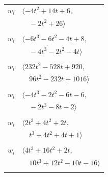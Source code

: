 \documentclass[11pt]{article}
\begin{document}
\begin{longtable}{@{}ll@{}}
$w_i$ & $\langle -4t^{2}+14t+6,$\\
 & $\quad -2t^{2}+26\rangle$\\
\addlinespace[2pt]
\multicolumn{2}{@{}p{0.97\textwidth}@{}}{$i=23$, $D_i=1$, $\rho_{ij}$: $1{:}1, \allowbreak 2{:}2, \allowbreak 3{:}2, \allowbreak 13{:}1, \allowbreak 18{:}2, \allowbreak 24{:}1, \allowbreak 33{:}2, \allowbreak 40{:}1$}\\
$w_i$ & $\langle -6t^{3}-6t^{2}-4t+8,$\\
 & $\quad -4t^{3}-2t^{2}-4t\rangle$\\
\addlinespace[2pt]
\multicolumn{2}{@{}p{0.97\textwidth}@{}}{$i=24$, $D_i=1$, $\rho_{ij}$: $9{:}1, \allowbreak 13{:}1, \allowbreak 15{:}2, \allowbreak 16{:}2, \allowbreak 18{:}2, \allowbreak 23{:}2, \allowbreak 27{:}2, \allowbreak 29{:}1, \allowbreak 30{:}1, \allowbreak 31{:}2, \allowbreak 36{:}1, \allowbreak 39{:}2, \allowbreak 40{:}1$}\\
$w_i$ & $\langle 232t^{2}-528t+920,$\\
 & $\quad 96t^{2}-232t+1016\rangle$\\
\addlinespace[2pt]
\multicolumn{2}{@{}p{0.97\textwidth}@{}}{$i=25$, $D_i=1$, $\rho_{ij}$: $0{:}1, \allowbreak 2{:}2, \allowbreak 4{:}2, \allowbreak 6{:}1, \allowbreak 14{:}2, \allowbreak 15{:}2, \allowbreak 22{:}1, \allowbreak 26{:}2, \allowbreak 32{:}2, \allowbreak 34{:}1, \allowbreak 39{:}1, \allowbreak 41{:}1$}\\
$w_i$ & $\langle -4t^{3}-2t^{2}-6t-6,$\\
 & $\quad -2t^{3}-8t-2\rangle$\\
\addlinespace[2pt]
\multicolumn{2}{@{}p{0.97\textwidth}@{}}{$i=26$, $D_i=1$, $\rho_{ij}$: $2{:}2, \allowbreak 12{:}1, \allowbreak 14{:}2, \allowbreak 17{:}1, \allowbreak 25{:}1, \allowbreak 34{:}1$}\\
$w_i$ & $\langle 2t^{3}+4t^{2}+2t,$\\
 & $\quad t^{3}+4t^{2}+4t+1\rangle$\\
\addlinespace[2pt]
\multicolumn{2}{@{}p{0.97\textwidth}@{}}{$i=27$, $D_i=1$, $\rho_{ij}$: $0{:}1, \allowbreak 2{:}1, \allowbreak 3{:}2, \allowbreak 10{:}1, \allowbreak 17{:}2, \allowbreak 24{:}1, \allowbreak 30{:}1, \allowbreak 31{:}1, \allowbreak 32{:}1, \allowbreak 34{:}1$}\\
$w_i$ & $\langle 4t^{3}+16t^{2}+2t,$\\
 & $\quad 10t^{3}+12t^{2}-10t-16\rangle$\\
\addlinespace[2pt]
\multicolumn{2}{@{}p{0.97\textwidth}@{}}{$i=28$, $D_i=1$, $\rho_{ij}$: $4{:}1, \allowbreak 5{:}1, \allowbreak 18{:}2, \allowbreak 19{:}1, \allowbreak 22{:}2, \allowbreak 39{:}2$}\\

\end{longtable}
\end{document}
